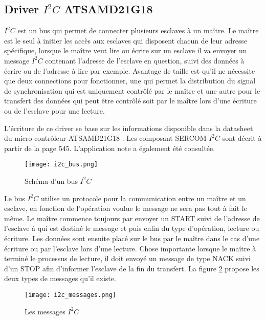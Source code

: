 \subsection{Driver $I^{2}C$ ATSAMD21G18}

$I^{2}C$ est un bus qui permet de connecter plusieurs esclaves à un maître. Le maître est le seul à initier les accès aux esclaves qui disposent chacun de leur adresse spécifique, lorsque le maître veut lire ou écrire sur un esclave il va envoyer un message $I^{2}C$ contenant l'adresse de l'esclave en question, suivi des données à écrire ou de l'adresse à lire par exemple. Avantage de taille est qu'il ne nécessite que deux connections pour fonctionner, une qui permet la distribution du signal de synchronisation qui est uniquement contrôlé par le maître et une autre pour le transfert des données qui peut être contrôlé soit par le maître lors d'une écriture ou de l'esclave pour une lecture.

L'écriture de ce driver se base sur les informations disponible dans la datasheet du micro-contrôleur ATSAMD21G18 \cite{samd21-datasheet}. Les composant SERCOM $I^{2}C$ sont décrit à partir de la page 545. L'application note \cite{samd21-i2c-configuration} a également été consultée.

\begin{figure}[htb]
\centering 
\texttt{[image: i2c\_bus.png]} 
\caption{Schéma d'un bus $I^{2}C$}
\label{fig:i2c_bus}
\end{figure}

Le bus $I^{2}C$ utilise un protocole pour la communication entre un maître et un esclave, en fonction de l'opération voulue le message ne sera pas tout à fait le même. Le maître commence toujours par envoyer un START suivi de l'adresse de l'esclave à qui est destiné le message et puis enfin du type d'opération, lecture ou écriture. Les données sont ensuite placé sur le bus par le maître dans le cas d'une écriture ou par l'esclave lors d'une lecture. Chose importante lorsque le maître à terminé le processus de lecture, il doit envoyé un message de type NACK suivi d'un STOP afin d'informer l'esclave de la fin du transfert.
La figure \ref{fig:i2c_messages} propose les deux types de messages qu'il existe.

\begin{figure}[htb]
\centering 
\texttt{[image: i2c\_messages.png]} 
\caption{Les messages $I^{2}C$}
\label{fig:i2c_messages}
\end{figure}

